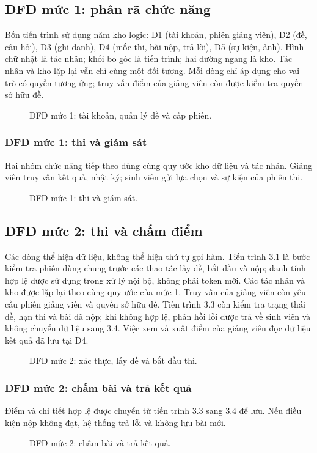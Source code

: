 \subsection{DFD mức 1: phân rã chức năng}
Bốn tiến trình sử dụng năm kho logic: D1 (tài khoản, phiên giảng viên), D2 (đề, câu hỏi), D3 (ghi danh), D4 (mốc thi, bài nộp, trả lời), D5 (sự kiện, ảnh). Hình chữ nhật là tác nhân; khối bo góc là tiến trình; hai đường ngang là kho. Tác nhân và kho lặp lại vẫn chỉ cùng một đối tượng. Mỗi dòng chỉ áp dụng cho vai trò có quyền tương ứng; truy vấn điểm của giảng viên còn được kiểm tra quyền sở hữu đề.
\begin{figure}[H]\centering
\caption{DFD mức 1: tài khoản, quản lý đề và cấp phiên.}\end{figure}
\clearpage
\subsubsection*{DFD mức 1: thi và giám sát}
Hai nhóm chức năng tiếp theo dùng cùng quy ước kho dữ liệu và tác nhân. Giảng viên truy vấn kết quả, nhật ký; sinh viên gửi lựa chọn và sự kiện của phiên thi.
\begin{figure}[H]\centering
\caption{DFD mức 1: thi và giám sát.}\end{figure}
\clearpage
\subsection{DFD mức 2: thi và chấm điểm}
Các dòng thể hiện dữ liệu, không thể hiện thứ tự gọi hàm. Tiến trình 3.1 là bước kiểm tra phiên dùng chung trước các thao tác lấy đề, bắt đầu và nộp; danh tính hợp lệ được sử dụng trong xử lý nội bộ, không phải token mới. Các tác nhân và kho được lặp lại theo cùng quy ước của mức 1. Truy vấn của giảng viên còn yêu cầu phiên giảng viên và quyền sở hữu đề. Tiến trình 3.3 còn kiểm tra trạng thái đề, hạn thi và bài đã nộp; khi không hợp lệ, phản hồi lỗi được trả về sinh viên và không chuyển dữ liệu sang 3.4. Việc xem và xuất điểm của giảng viên đọc dữ liệu kết quả đã lưu tại D4.
\begin{figure}[H]\centering
\caption{DFD mức 2: xác thực, lấy đề và bắt đầu thi.}\end{figure}
\clearpage
\subsubsection*{DFD mức 2: chấm bài và trả kết quả}
Điểm và chi tiết hợp lệ được chuyển từ tiến trình 3.3 sang 3.4 để lưu. Nếu điều kiện nộp không đạt, hệ thống trả lỗi và không lưu bài mới.
\begin{figure}[H]\centering
\caption{DFD mức 2: chấm bài và trả kết quả.}\end{figure}

